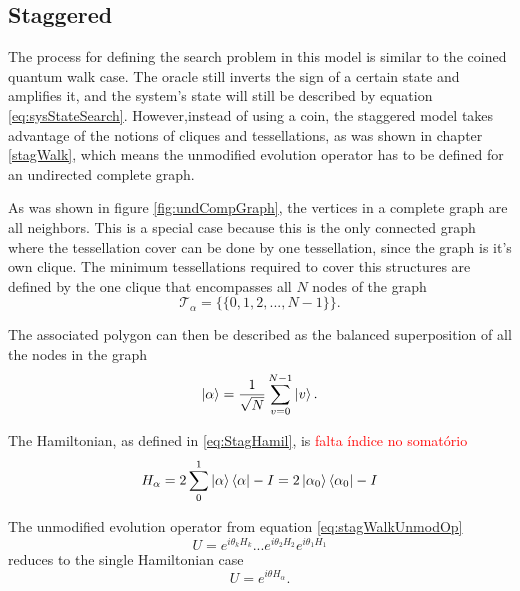                \subsection{Staggered}
               The process for defining the search problem in this model is similar to the coined quantum walk case. The oracle still inverts the sign of a certain state and amplifies it, and the system's state will still be described by equation \ref{eq:sysStateSearch}. However,instead of using a coin, the staggered model takes advantage of the notions of cliques and tessellations, as was shown in chapter \ref{stagWalk}, which means the unmodified evolution operator has to be defined for an undirected complete graph.\par
               As was shown in figure \ref{fig:undCompGraph}, the vertices in a complete graph are all neighbors. This is a special case because this is the only connected graph where the tessellation cover can be done by one tessellation, since the graph is it's own clique. The minimum tessellations required to cover this structures are defined by the one clique that encompasses all $N$ nodes of the graph
               \begin{equation}
                   \mathscr{T}_{\alpha} = \{\{0,1,2,...,N-1\}\}.
               \end{equation}\par
               The associated polygon can then be described as the balanced superposition of all the nodes in the graph
               \begin{equation}
                   \ket{\alpha} = \frac{1}{\sqrt{N}} \sum_{v=0}^{N-1} \ket{v}.
               \end{equation}\par
               The Hamiltonian, as defined in \ref{eq:StagHamil}, is \textcolor{red}{falta índice no somatório}
               \begin{equation}
                   H_\alpha = 2\sum_0^1\ket{\alpha}\bra{\alpha} - I = 2\ket{\alpha_0}\bra{\alpha_0} - I
               \end{equation}\par
               The unmodified evolution operator from equation \ref{eq:stagWalkUnmodOp}
               \begin{equation}
                   	U = e^{i\theta_{k}H_{k}}...e^{i\theta_{2}H_{2}}e^{i\theta_{1}H_{1}}
               \end{equation}
               reduces to the single Hamiltonian case
               \begin{equation}
                   U = e^{i\theta H_\alpha}.
                   \label{eq:stagQWSearchUnmodEvo1}
               \end{equation}\par
